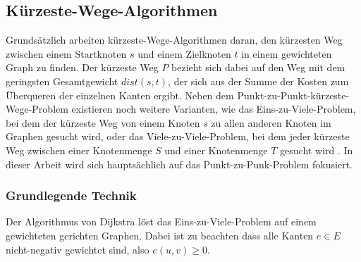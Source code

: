 \subsection{Kürzeste-Wege-Algorithmen}
Grundsätzlich arbeiten kürzeste-Wege-Algorithmen daran, den kürzesten Weg zwischen einem Startknoten
$s$ und einem Zielknoten $t$ in einem gewichteten Graph zu finden. Der kürzeste Weg $P$ bezieht sich
dabei auf den Weg mit dem geringsten Gesamtgewicht $dist(s,t)$, der sich aus der Summe der Kosten
zum Überqueren der einzelnen Kanten ergibt. Neben dem Punkt-zu-Punkt-kürzeste-Wege-Problem
existieren noch weitere Varianten, wie das Eins-zu-Viele-Problem, bei dem der kürzeste Weg von einem
Knoten $s$ zu allen anderen Knoten im Graphen gesucht wird, oder das Viele-zu-Viele-Problem, bei dem
jeder kürzeste Weg zwischen einer Knotenmenge $S$ und einer Knotenmenge $T$ gesucht wird
\cite{Bast.20.04.2015}. In dieser Arbeit wird sich hauptsächlich auf das Punkt-zu-Punk-Problem
fokusiert.\\

\subsubsection{Grundlegende Technik}
Der Algorithmus von Dijkstra löst das Eins-zu-Viele-Problem auf einem gewichteten gerichten Graphen.
Dabei ist zu beachten dass alle Kanten $e \in E$ nicht-negativ gewichtet sind, also $e(u,v) \geq 0$.

